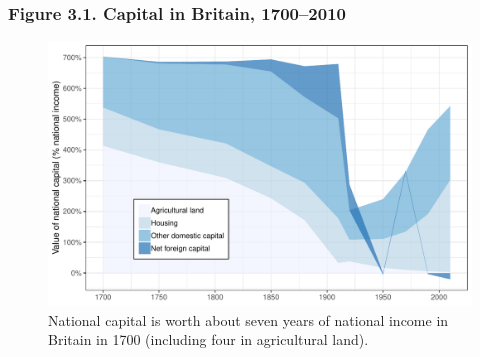 \documentclass[t]{beamer}\usepackage[]{graphicx}\usepackage[]{color}
\newenvironment{knitrout}{}{} %
\begin{document}
\begin{frame}[label=Figure_3_1]
\frametitle{Figure 3.1. Capital in Britain, 1700--2010}
\begin{figure}[t]
\begin{minipage}[b]{\textwidth}
\centering
\begin{knitrout}\footnotesize
{}\color{fgcolor}

{\centering \includegraphics[width=1\linewidth]{figures/color/Figure_3_1} 

}



\end{knitrout}
\caption{National capital is worth about seven years of national income in Britain in 1700 (including four in agricultural land).}
\end{minipage}
\end{figure}
\end{frame}
\end{document}
